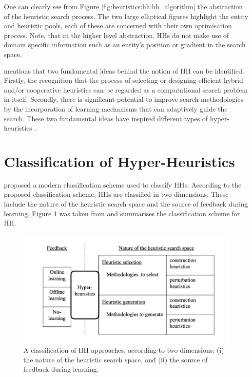 One can clearly see from Figure \ref{fig:heuristics:hh:hh_algorithm} the abstraction of the heuristic search process. The two large elliptical figures highlight the entity and heuristic pools, each of these are concerned with their own optimisation process. Note, that at the higher level abstraction, \acp{HH} do not make use of domain specific information such as an entity's position or gradient in the search space.

\citeauthor{ref:grobler:2015}\cite{ref:grobler:2015} mentions that two fundamental ideas behind the notion of \ac{HH} can be identified. Firstly, the recognition that the process of selecting or designing efficient hybrid and/or cooperative heuristics can be regarded as a computational search problem in itself. Secondly, there is significant potential to improve search methodologies by the incorporation of learning mechanisms that can adaptively guide the search. These two fundamental ideas have inspired different types of hyper-heuristics \cite{ref:burke:2010}.


\section{Classification of Hyper-Heuristics}
\label{sec:hh:classification}

\citeauthor{ref:burke:2010}\cite{ref:burke:2010} proposed a modern classification scheme used to classify \acp{HH}. According to the proposed classification scheme, \acp{HH} are classified in two dimensions. These include the nature of the heuristic search space and the source of feedback during learning. Figure \ref{fig:heuristics:hh:classification} was taken from \cite{ref:burke:2010} and summarises the classification scheme for \ac{HH}.

\begin{figure}[htbp]
    \includegraphics[width=\textwidth]{images/hh_classification.png}
    \caption{A classification of \ac{HH} approaches, according to two dimensions: (i) the nature of the heuristic search space, and (ii) the source of feedback during learning.}
    \label{fig:heuristics:hh:classification}
\end{figure}

